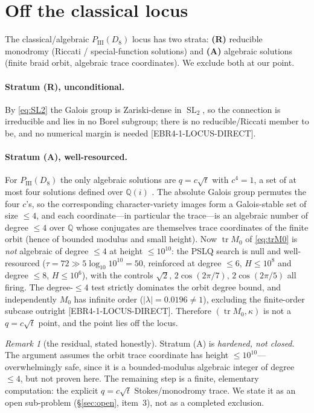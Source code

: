 \documentclass[11pt,reqno]{amsart}
\theoremstyle{plain}
\theoremstyle{definition}
\theoremstyle{remark}
\newtheorem{remark}[theorem]{Remark}
\newcommand{\Q}{\mathbb{Q}}
\newcommand{\SL}{\operatorname{SL}}
\newcommand{\tr}{\operatorname{tr}}
\newcommand{\claim}[1]{\textsf{\small[#1]}}
\newcommand{\PIII}{P_{\mathrm{III}}}
\begin{document}
\section{Off the classical locus}\label{sec:locus}

The classical/algebraic $\PIII(D_{8})$ locus has two strata: \textbf{(R)}
reducible monodromy (Riccati / special-function solutions) and \textbf{(A)}
algebraic solutions (finite braid orbit, algebraic trace coordinates). We
exclude both at our point.

\paragraph{Stratum (R), unconditional.} By \eqref{eq:SL2} the Galois group is
Zariski-dense in $\SL_{2}$, so the connection is irreducible and lies in no
Borel subgroup; there is no reducible/Riccati member to be, and no numerical
margin is needed \claim{EBR4-1-LOCUS-DIRECT}.

\paragraph{Stratum (A), well-resourced.} For $\PIII(D_{8})$ the only algebraic
solutions are $q=c\sqrt{t}$ with $c^{4}=1$, a set of at most four solutions
defined over $\Q(i)$ \cite{OKSO}. The absolute Galois group permutes the four
$c$'s, so the corresponding character-variety images form a Galois-stable set of
size $\le4$, and each coordinate---in particular the trace---is an algebraic
number of degree $\le4$ over $\Q$ whose conjugates are themselves trace
coordinates of the finite orbit (hence of bounded modulus and small height).
Now $\tr M_{0}$ of \eqref{eq:trM0} is \emph{not} algebraic of degree $\le4$ at
height $\le10^{10}$: the PSLQ search is null and well-resourced
($\tau=72\gg5\log_{10}10^{10}=50$, reinforced at degree $\le6$, $H\le10^{8}$ and
degree $\le8$, $H\le10^{6}$), with the controls
$\sqrt2,\,2\cos(2\pi/7),\,2\cos(2\pi/5)$ all firing. The degree-$\le4$ test
strictly dominates the orbit degree bound, and independently $M_{0}$ has
infinite order ($|\lambda|=0.0196\neq1$), excluding the finite-order subcase
outright \claim{EBR4-1-LOCUS-DIRECT}. Therefore $(\tr M_{0},\kappa)$ is not a
$q=c\sqrt{t}$ point, and the point lies off the locus.

\begin{remark}[the residual, stated honestly]\label{rem:G5}
Stratum (A) is \emph{hardened, not closed}. The argument assumes the orbit trace
coordinate has height $\le10^{10}$---overwhelmingly safe, since it is a
bounded-modulus algebraic integer of degree $\le4$, but not proven here. The
remaining step is a finite, elementary computation: the explicit
$q=c\sqrt{t}$ Stokes/monodromy trace. We state it as an open sub-problem
(\S\ref{sec:open}, item~3), not as a completed exclusion.
\end{remark}
\end{document}

